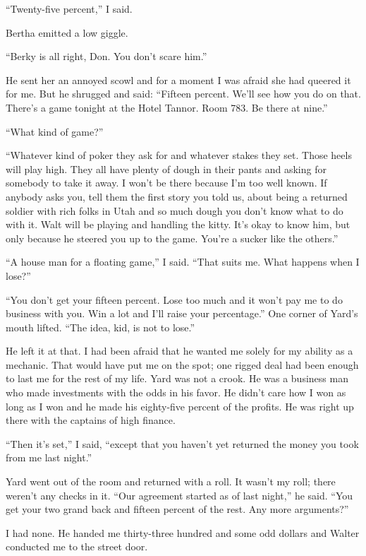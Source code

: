 \documentclass{novel}
\begin{document}
“Twenty-five percent,” I said.

Bertha emitted a low giggle.

“Berky is all right, Don. You don’t scare him.”

He sent her an annoyed scowl and for a moment I was afraid she had queered it for me. But he shrugged and said: “Fifteen percent. We’ll see how you do on that. There’s a game tonight at the Hotel Tannor. Room 783. Be there at nine.”

“What kind of game?”

“Whatever kind of poker they ask for and whatever stakes they set. Those heels will play high. They all have plenty of dough in their pants and asking for somebody to take it away. I won’t be there because I’m too well known. If anybody asks you, tell them the first story you told us, about being a returned soldier with rich folks in Utah and so much dough you don’t know what to do with it. Walt will be playing and handling the kitty. It’s okay to know him, but only because he steered you up to the game. You’re a sucker like the others.”

“A house man for a floating game,” I said. “That suits me. What happens when I lose?”

“You don’t get your fifteen percent. Lose too much and it won’t pay me to do business with you. Win a lot and I’ll raise your percentage.” One corner of Yard’s mouth lifted. “The idea, kid, is not to lose.”

He left it at that. I had been afraid that he wanted me solely for my ability as a mechanic. That would have put me on the spot; one rigged deal had been enough to last me for the rest of my life. Yard was not a crook. He was a business man who made investments with the odds in his favor. He didn’t care how I won as long as I won and he made his eighty-five percent of the profits. He was right up there with the captains of high finance.

“Then it’s set,” I said, “except that you haven’t yet returned the money you took from me last night.”

Yard went out of the room and returned with a roll. It wasn’t my roll; there weren’t any checks in it. “Our agreement started as of last night,” he said. “You get your two grand back and fifteen percent of the rest. Any more arguments?”

I had none. He handed me thirty-three hundred and some odd dollars and Walter conducted me to the street door.

\scenestars
\end{document}
